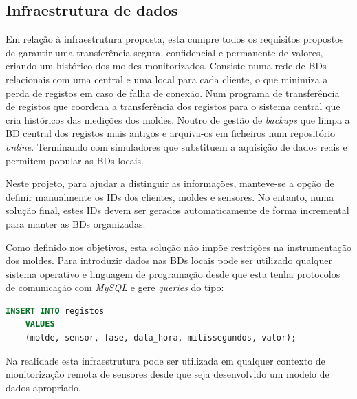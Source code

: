 \documentclass[11pt,twoside,a4paper]{report}
\begin{document}
\subsection{Infraestrutura de dados}
Em relação à infraestrutura proposta, esta cumpre todos os requisitos propostos de garantir uma transferência segura, confidencial e permanente de valores, criando um histórico dos moldes monitorizados. Consiste numa rede de BDs relacionais com uma central e uma local para cada cliente, o que minimiza a perda de registos em caso de falha de conexão. Num programa de transferência de registos que coordena a transferência dos registos para o sistema central que cria históricos das medições dos moldes. Noutro de gestão de \textit{backups} que limpa a BD central dos registos mais antigos e arquiva-os em ficheiros num repositório \textit{online}. Terminando com simuladores que substituem a aquisição de dados reais e permitem popular as BDs locais.\par 
Neste projeto, para ajudar a distinguir as informações, manteve-se a opção de definir manualmente os IDs dos clientes, moldes e sensores. No entanto, numa solução final, estes IDs devem ser gerados automaticamente de forma incremental para manter as BDs organizadas.\par 
Como definido nos objetivos, esta solução não impõe restrições na instrumentação dos moldes. Para introduzir dados nas BDs locais pode ser utilizado qualquer sistema operativo e linguagem de programação desde que esta tenha protocolos de comunicação com \textit{MySQL} e gere \textit{queries} do tipo:
\begin{lstlisting}[language = SQL]
	INSERT INTO registos
	VALUES
	(molde, sensor, fase, data_hora, milissegundos, valor);
\end{lstlisting}
Na realidade esta infraestrutura pode ser utilizada em qualquer contexto de monitorização remota de sensores desde que seja desenvolvido um modelo de dados apropriado.\par
\end{document}
